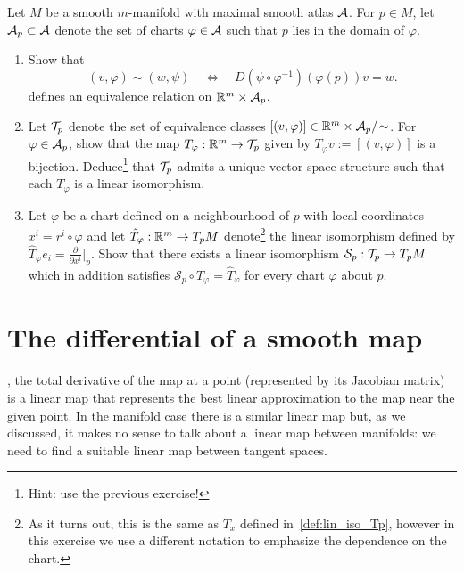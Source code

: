 \begin{exercise}
	Let $M$ be a smooth $m$-manifold with maximal smooth atlas $\mathcal{A}$.
	For $p\in M$, let $\mathcal{A}_p \subset \mathcal{A}$ denote the set of charts $\varphi\in\mathcal{A}$ such that $p$ lies in the domain of $\varphi$.
	\begin{enumerate}
		\item Show that
		      \begin{equation}
			      (v,\varphi) \sim (w, \psi)
			      \quad\Longleftrightarrow\quad
			      D(\psi \circ \varphi^{-1})(\varphi(p))v = w.
		      \end{equation}
		      defines an equivalence relation on $\mathbb{R}^m\times\mathcal{A}_p$.
		\item Let $\mathcal{T}_p$ denote the set of equivalence classes $[(v,\varphi)]\in \mathbb{R}^m\times\mathcal{A}_p/\!\sim$. For $\varphi\in\mathcal{A}_p$, show that the map $T_\varphi:\mathbb{R}^m\to\mathcal{T}_p$ given by $T_\varphi v := [(v,\varphi)]$ is a bijection.
		      Deduce\footnote{Hint: use the previous exercise!} that $\mathcal{T}_p$ admits a unique vector space structure such that each $T_\varphi$ is a linear isomorphism.
		\item Let $\varphi$ be a chart defined on a neighbourhood of $p$ with local coordinates $x^i = r^i \circ \varphi$ and let $\hat T_\varphi :\mathbb{R}^m \to T_pM$ denote\footnote{As it turns out, this is the same as $T_x$ defined in~\eqref{def:lin_iso_Tp}, however in this exercise we use a different notation to emphasize the dependence on the chart.} the linear isomorphism defined by $\hat T_\varphi e_i = \frac{\partial}{\partial x^i}\big|_p$.
		      Show that there exists a linear isomorphism $\mathcal{S}_p:\mathcal{T}_p\to T_pM$ which in addition satisfies $\mathcal{S}_p \circ T_\varphi = \hat T_\varphi$ for every chart $\varphi$ about $p$.
	\end{enumerate}
\end{exercise}

\section{The differential of a smooth map}\label{sec:diffsmooth}

, the total derivative of the map at a point (represented by its Jacobian matrix) is a linear map that represents the best linear approximation to the map near the given point.
In the manifold case there is a similar linear map but, as we discussed, it makes no sense to talk about a linear map between manifolds: we need to find a suitable linear map between tangent spaces.

